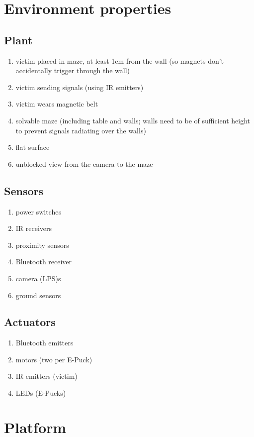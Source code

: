 \documentclass[a4paper,parskip,headheight=38pt]{scrartcl} %
\begin{document}
\section{Environment properties}

\subsection{Plant}
\begin{enumerate}[label=\plant]
\item victim placed in maze, at least 1cm from the wall (so magnets don't accidentally trigger through the wall)
\item victim sending signals (using IR emitters)
\item victim wears magnetic belt
\item solvable maze (including table and walls; walls need to be of sufficient height to prevent signals radiating over the walls)
\item flat surface
\item unblocked view from the camera to the maze
\end{enumerate}

\subsection{Sensors}
\begin{enumerate}[label=\sensors]
\item power switches
\item IR receivers
\item proximity sensors
\item Bluetooth receiver
\item camera (LPS)s
\item ground sensors
\end{enumerate}

\subsection{Actuators}
\begin{enumerate}[label=\actuators]
\item Bluetooth emitters
\item motors (two per E-Puck)
\item IR emitters (victim)
\item LEDs (E-Pucks)
\end{enumerate}


\section{Platform}
\end{document}
